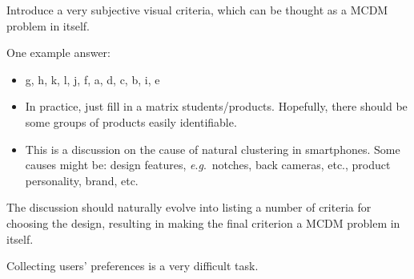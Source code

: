 \documentclass[10pt, UKenglish]{exam}
\begin{document}
\begin{questions}

	\begin{comments}
		Introduce a very subjective visual criteria, which can be
		thought as a MCDM problem in itself.
	\end{comments}
	
	\begin{solutionorbox}
		One example answer: 
		\begin{itemize}
			\item g, h, k, l, j, f, a, d, c, b, i, e
			\item In practice, just fill in a matrix
				students/products. Hopefully, there should be
				some groups of products easily identifiable.
			\item This is a discussion on the cause of natural
				clustering in
				smartphones. Some causes might be: design
				features, \textit{e}.\textit{g}.\ notches, back
				cameras, etc., product personality, brand, etc.
		\end{itemize}

		The discussion should naturally evolve into listing a number of
		criteria for choosing the design, resulting in making the final
		criterion a MCDM problem in itself. 

		Collecting users' preferences is a very difficult task.
	\end{solutionorbox}
\end{questions}
\end{document}
